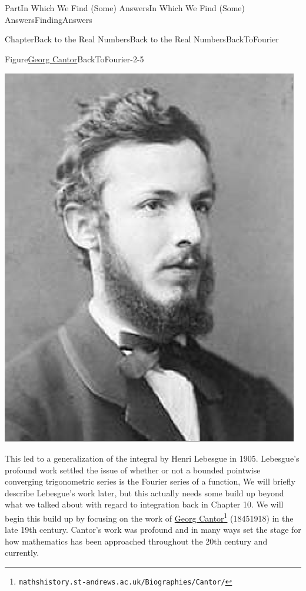 \documentclass[oneside,10pt,]{book}
\numberwithin{equation}{part}
\begin{document}
\begin{partptx}{Part}{In Which We Find (Some) Answers}{}{In Which We Find (Some) Answers}{}{}{FindingAnswers}
\begin{chapterptx}{Chapter}{Back to the Real Numbers}{}{Back to the Real Numbers}{}{}{BackToFourier}
\begin{introduction}{}
\begin{figureptx}{Figure}{\href{https://mathshistory.st-andrews.ac.uk/Biographies/Cantor/}{Georg Cantor}\protect\footnotemark{}}{BackToFourier-2-5}{}
\begin{image}{0.325}{0.35}{0.325}{}
\includegraphics[width=\linewidth]{external/images/Cantor.png}
\end{image}%
\tcblower
\end{figureptx}%
%
 This led to a generalization of the integral by Henri Lebesgue in 1905.  Lebesgue's profound work settled the issue of whether or not a bounded pointwise converging trigonometric series is the Fourier series of a function, We will briefly describe Lebesgue's work later, but this actually needs some build up beyond what we talked about with regard to integration back in Chapter 10.  We will begin this build up by focusing on the work of \href{https://mathshistory.st-andrews.ac.uk/Biographies/Cantor/}{Georg Cantor}\footnote{\nolinkurl{mathshistory.st-andrews.ac.uk/Biographies/Cantor/}\label{BackToFourier-2-6-5}} (1845\textendash{}1918) in the late 19th century. Cantor's work was profound and in many ways set the stage for how mathematics has been approached throughout the 20th century and currently.     %

\end{introduction}
\end{chapterptx}
\end{partptx}
\end{document}

